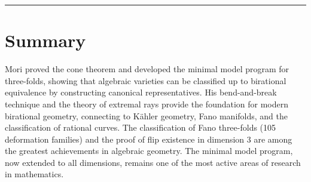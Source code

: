 \begin{center}\rule{0.5\linewidth}{0.5pt}\end{center}

\section*{Summary}

Mori proved the cone theorem and developed the minimal model program for
three-folds, showing that algebraic varieties can be classified up to birational
equivalence by constructing canonical representatives. His bend-and-break
technique and the theory of extremal rays provide the foundation for modern
birational geometry, connecting to K\"ahler geometry, Fano manifolds, and the
classification of rational curves. The classification of Fano three-folds
(105 deformation families) and the proof of flip existence in dimension 3 are
among the greatest achievements in algebraic geometry. The minimal model program,
now extended to all dimensions, remains one of the most active areas of
research in mathematics.
